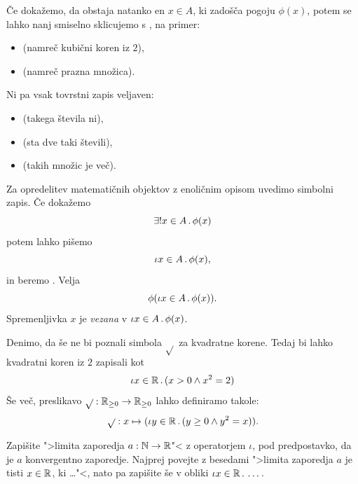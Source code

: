 Če dokažemo, da obstaja natanko en $x \in A$, ki zadošča pogoju $\phi(x)$, potem se lahko nanj smiselno sklicujemo s , na primer:
%
\begin{itemize}
\item {} (namreč kubični koren iz $2$),
\item {} (namreč prazna množica).
\end{itemize}
%
Ni pa vsak tovrstni zapis veljaven:
%
\begin{itemize}
\item {} (takega števila ni),
\item {} (sta dve taki števili),
\item {} (takih množic je več).
\end{itemize}
%
Za opredelitev matematičnih objektov z enoličnim opisom uvedimo simbolni zapis. Če dokažemo
%
\begin{equation*}
    \exists! x \in A \,.\, \phi(x)
\end{equation*}
%
potem lahko pišemo
%
\begin{equation*}
  \iota x \in A \,.\, \phi(x),
\end{equation*}
%
in beremo .
%
Velja
%
\begin{equation*}
  \phi(\iota x \in A \,.\, \phi(x)).
\end{equation*}
%
Spremenljivka $x$ je \emph{vezana} v $\iota x \in A \,.\, \phi(x)$.

\begin{zgled}
  Denimo, da še ne bi poznali simbola $\sqrt{}$ za kvadratne korene. Tedaj bi
  lahko kvadratni koren iz $2$ zapisali kot
  \begin{equation*}
    \iota x \in \mathbb{R} \,.\, (x > 0 \land x^2 = 2)
  \end{equation*}
  Še več, preslikavo $\sqrt{} : \mathbb{R}_{\geq 0} \to \mathbb{R}_{\geq 0}$ lahko definiramo takole:
  \begin{equation*}
    \sqrt{} : x \mapsto (\iota y \in \mathbb{R} \,.\, (y \geq 0 \land y^2 = x)).
  \end{equation*}
\end{zgled}

\begin{vaja}
  Zapišite ">limita zaporedja $a : \mathbb{N} \to \mathbb{R}$"< z operatorjem $\iota$, pod predpostavko,
  da je $a$ konvergentno zaporedje. Najprej povejte z besedami ">limita zaporedja $a$ je
  tisti $x \in \mathbb{R}$, ki \dots"<, nato pa zapišite še v obliki $\iota x \in \mathbb{R} \,.\, \dots$.
\end{vaja}


